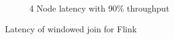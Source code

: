 \begin{figure}
\begin{subfigure}[b]{0.3\textwidth}
       \caption{4 Node latency with 90\% throughput }
   \end{subfigure}



        \caption{Latency of windowed join for Flink}
\end{figure}